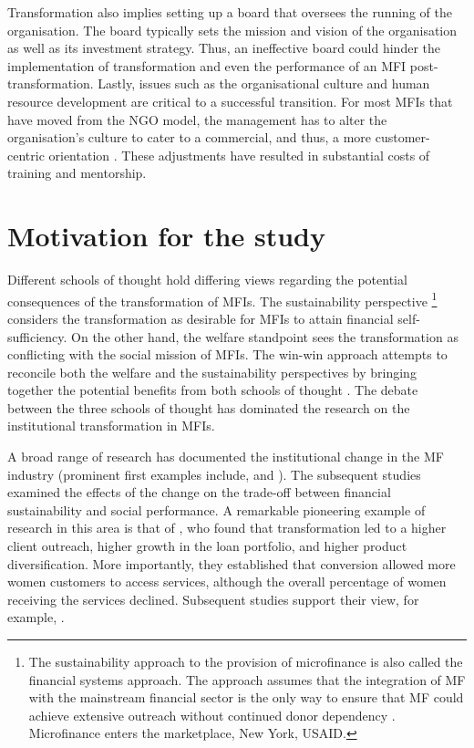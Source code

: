 \documentclass[a4paper, nobind]{templates/ociamthesis}
\begin{document}
Transformation also implies setting up a board that oversees the running of the organisation. The board typically sets the mission and vision of the organisation as well as its investment strategy. Thus, an ineffective board could hinder the implementation of transformation \autocite{campion1999institutional} and even the performance of an MFI post-transformation. Lastly, issues such as the organisational culture and human resource development are critical to a successful transition. For most MFIs that have moved from the NGO model, the management has to alter the organisation's culture to cater to a commercial, and thus, a more customer-centric orientation \autocite{christen2001commercialization}. These adjustments have resulted in substantial costs of training and mentorship.

\hypertarget{motivation-for-the-study}{%
\section{Motivation for the study}\label{motivation-for-the-study}}

\noindent Different schools of thought hold differing views regarding the potential consequences of the transformation of MFIs. The sustainability perspective \footnote{The sustainability approach to the provision of microfinance is also called the financial systems approach. The approach assumes that the integration of MF with the mainstream financial sector is the only way to ensure that MF could achieve extensive outreach without continued donor dependency \autocite{rhyne1999microfinance}. Microfinance enters the marketplace, New York, USAID.} considers the transformation as desirable for MFIs to attain financial self-sufficiency. On the other hand, the welfare standpoint sees the transformation as conflicting with the social mission of MFIs. The win-win approach attempts to reconcile both the welfare and the sustainability perspectives by bringing together the potential benefits from both schools of thought \autocite{kodongo2013individual}. The debate between the three schools of thought has dominated the research on the institutional transformation in MFIs.

A broad range of research has documented the institutional change in the MF industry (prominent first examples include,\textcite{ledgerwood1998microfinance} and \textcite{ledgerwood2006transforming}). The subsequent studies examined the effects of the change on the trade-off between financial sustainability and social performance. A remarkable pioneering example of research in this area is that of \textcite{frank2008stemming}, who found that transformation led to a higher client outreach, higher growth in the loan portfolio, and higher product diversification. More importantly, they established that conversion allowed more women customers to access services, although the overall percentage of women receiving the services declined. Subsequent studies support their view, for example, \autocites[ ]{hartarska2012governance,bos2015practice}{d2017ngos}.
\end{document}

